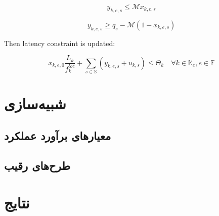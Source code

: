\begin{equation}
    y_{k,e,s} \leq \mathcal{M} x_{k,e,s}
\end{equation}

\begin{equation}
    y_{k,e,s} \geq q_s - \mathcal{M} (1-x_{k,e,s})
\end{equation}

Then latency constraint is updated:

\begin{equation} \label{latency_con}
    x_{k,e,0}\frac{L_k}{f^{loc}_k} + \sum_{s \in \mathbb{S}} \left(y_{k,e,s} + u_{k,s}\right) \leq \Theta_k \quad \forall k \in \mathbb{K}_e, e \in \mathbb{E}
\end{equation}

\section{شبیه‌سازی}

\subsection{معیارهای برآورد عملکرد}

\subsection{طرح‌های رقیب}

\section{نتایج}
